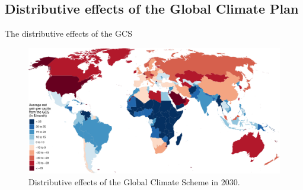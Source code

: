 \documentclass[aspectratio=169,xcolor=dvipsnames, 11pt,mathserif]{beamer}
\begin{document}
\begin{framefont}{\small}

\subsection{Distributive effects of the Global Climate Plan}

\begin{frame}{The distributive effects of the GCS\label{other_distributive} \hyperlink{GCS_gain}{}}
    \begin{figure}
        \centering 
        \caption{Distributive effects of the Global Climate Scheme in 2030.}
        \includegraphics[height=.8\textheight]{../figures/maps/mean_gain_2030.pdf} 
    \end{figure}        
\end{frame}


\end{framefont}
\end{document}
